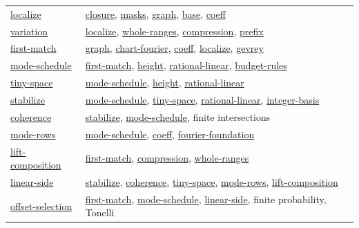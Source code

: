 \documentclass[11pt]{article}
\theoremstyle{definition}
\numberwithin{equation}{section}
\begin{document}
\begin{longtable}{@{}p{}p{}@{}}
\hyperlink{bp:localize}{localize} & \hyperlink{bp:closure}{closure}, \hyperlink{bp:masks}{masks}, \hyperlink{bp:graph}{graph}, \hyperlink{bp:base}{base}, \hyperlink{bp:coeff}{coeff}\\[3pt]
\hyperlink{bp:variation}{variation} & \hyperlink{bp:localize}{localize}, \hyperlink{bp:whole-ranges}{whole-ranges}, \hyperlink{bp:compression}{compression}, \hyperlink{bp:prefix}{prefix}\\[3pt]
\hyperlink{bp:first-match}{first-match} & \hyperlink{bp:graph}{graph}, \hyperlink{bp:chart-fourier}{chart-fourier}, \hyperlink{bp:coeff}{coeff}, \hyperlink{bp:localize}{localize}, \hyperlink{bp:gevrey}{gevrey}\\[3pt]
\hyperlink{bp:mode-schedule}{mode-schedule} & \hyperlink{bp:first-match}{first-match}, \hyperlink{bp:height}{height}, \hyperlink{bp:rational-linear}{rational-linear}, \hyperlink{bp:budget-rules}{budget-rules}\\[3pt]
\hyperlink{bp:tiny-space}{tiny-space} & \hyperlink{bp:mode-schedule}{mode-schedule}, \hyperlink{bp:height}{height}, \hyperlink{bp:rational-linear}{rational-linear}\\[3pt]
\hyperlink{bp:stabilize}{stabilize} & \hyperlink{bp:mode-schedule}{mode-schedule}, \hyperlink{bp:tiny-space}{tiny-space}, \hyperlink{bp:rational-linear}{rational-linear}, \hyperlink{bp:integer-basis}{integer-basis}\\[3pt]
\hyperlink{bp:coherence}{coherence} & \hyperlink{bp:stabilize}{stabilize}, \hyperlink{bp:mode-schedule}{mode-schedule}, finite intersections\\[3pt]
\hyperlink{bp:mode-rows}{mode-rows} & \hyperlink{bp:mode-schedule}{mode-schedule}, \hyperlink{bp:coeff}{coeff}, \hyperlink{bp:fourier-foundation}{fourier-foundation}\\[3pt]
\hyperlink{bp:lift-composition}{lift-composition} & \hyperlink{bp:first-match}{first-match}, \hyperlink{bp:compression}{compression}, \hyperlink{bp:whole-ranges}{whole-ranges}\\[3pt]
\hyperlink{bp:linear-side}{linear-side} & \hyperlink{bp:stabilize}{stabilize}, \hyperlink{bp:coherence}{coherence}, \hyperlink{bp:tiny-space}{tiny-space}, \hyperlink{bp:mode-rows}{mode-rows}, \hyperlink{bp:lift-composition}{lift-composition}\\[3pt]
\hyperlink{bp:offset-selection}{offset-selection} & \hyperlink{bp:first-match}{first-match}, \hyperlink{bp:mode-schedule}{mode-schedule}, \hyperlink{bp:linear-side}{linear-side}, finite probability, Tonelli\\[3pt]

\end{longtable}
\end{document}
